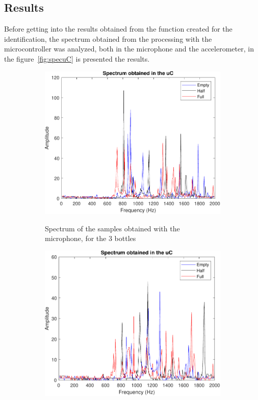 \subsection{Results}
Before getting into the results obtained from the function created for the identification, the spectrum obtained from the processing with the microcontroller was analyzed, both in the microphone and the accelerometer, in the figure~\ref{fig:specuC} is presented the results.
\begin{figure}[]
    \centering
    \begin{subfigure}{0.45\textwidth}
        \centering
        \includegraphics[width=\linewidth]{Chapters/6CHP/Figures/ResultsuCGraphs/specMICuC.pdf}
        \caption{Spectrum of the samples obtained with the microphone, for the 3 bottles}{}
        \label{subfig:specMICuc}
    \end{subfigure}
    \begin{subfigure}{0.45\textwidth}
        \centering
        \includegraphics[width=\linewidth]{Chapters/6CHP/Figures/ResultsuCGraphs/uCGraphsSen.pdf}

\end{subfigure}
\end{figure}

